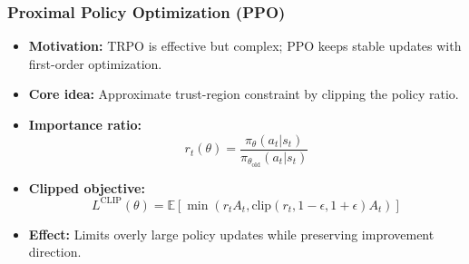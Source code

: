 \documentclass[11pt,aspectratio=169,xcolor={dvipsnames},usepdftitle=false]{beamer}
\begin{document}
\begin{frame}
\frametitle{Proximal Policy Optimization (PPO)}
\begin{itemize}

	\item \textbf{Motivation:}
	TRPO is effective but complex; PPO keeps stable updates with first-order optimization.

	\item \textbf{Core idea:}
	Approximate trust-region constraint by clipping the policy ratio.

	\item \textbf{Importance ratio:}
	$$
	r_t(\theta)=\frac{\pi_\theta(a_t|s_t)}{\pi_{\theta_{\text{old}}}(a_t|s_t)}
	$$

	\item \textbf{Clipped objective:}
	$$
	L^{\text{CLIP}}(\theta)
	=
	\mathbb{E}\left[
	\min\left(
	r_t A_t,
	\text{clip}(r_t,1-\epsilon,1+\epsilon)A_t
	\right)
	\right]
	$$

	\item \textbf{Effect:}
	Limits overly large policy updates while preserving improvement direction.

\end{itemize}
\end{frame}
\end{document}
